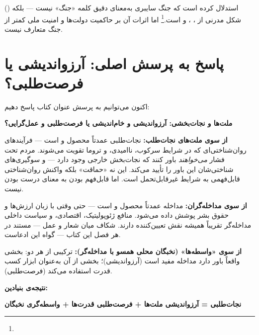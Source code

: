  () استدلال کرده است که جنگ سایبری به‌معنای دقیق کلمه «جنگ» نیست — بلکه شکل مدرنی از ، ، و  است.\footnote{} اما اثرات آن بر حاکمیت دولت‌ها و امنیت ملی کمتر از جنگ متعارف نیست.


\section{پاسخ به پرسش اصلی: آرزواندیشی یا فرصت‌طلبی؟}
\label{sec:ch14-answer}

اکنون می‌توانیم به پرسش عنوان کتاب پاسخ دهیم:

\textbf{ملت‌ها و نجات‌بخشی: آرزواندیشی و خام‌اندیشی یا فرصت‌طلبی و عمل‌گرایی؟}

\begin{tcolorbox}[casebox, title={پاسخ: «هر دو — اما نه به‌طور برابر»}]

\textbf{از سوی ملت‌های نجات‌طلب:}
نجات‌طلبی عمدتاً محصول  و  است — فرآیندهای روان‌شناختی‌ای که در شرایط سرکوب، ناامیدی، و تروما تقویت می‌شوند. مردم تحت فشار \textit{می‌خواهند} باور کنند که نجات‌بخش خارجی وجود دارد — و سوگیری‌های شناختی‌شان این باور را تأیید می‌کند. این نه «حماقت» بلکه واکنش روان‌شناختی قابل‌فهمی به شرایط غیرقابل‌تحمل است. اما قابل‌فهم بودن به معنای درست بودن نیست.

\textbf{از سوی مداخله‌گران:}
مداخله عمدتاً محصول  و  است — حتی وقتی با زبان ارزش‌ها و حقوق بشر پوشش داده می‌شود. منافع ژئوپولیتیک، اقتصادی، و سیاست داخلی مداخله‌گر تقریباً همیشه نقش تعیین‌کننده دارند. شکاف میان شعار و عمل — مستند در هر فصل این کتاب — گواه این ادعاست.

\textbf{از سوی «واسطه‌ها» (نخبگان محلی همسو با مداخله‌گر):}
ترکیبی از هر دو: بخشی واقعاً باور دارد مداخله مفید است (آرزواندیشی)؛ بخشی از آن به‌عنوان ابزار کسب قدرت استفاده می‌کند (فرصت‌طلبی).

\textbf{نتیجه‌ی بنیادین:}
\begin{center}
\textbf{نجات‌طلبی = آرزواندیشی ملت‌ها + فرصت‌طلبی قدرت‌ها + واسطه‌گری نخبگان}
\end{center}
\end{tcolorbox}


